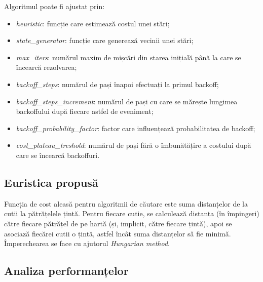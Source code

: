 \documentclass{article}
\begin{document}
Algoritmul poate fi ajustat prin:
\begin{itemize}
    \item \textit{heuristic}: funcție care estimează costul unei stări;
    \item \textit{state\_generator}: funcție care generează vecinii unei stări;
    \item \textit{max\_iters}: numărul maxim de mișcări din starea inițială până
    la care se încearcă rezolvarea;
    \item \textit{backoff\_steps}: numărul de pași înapoi efectuați la primul 
    backoff;
    \item \textit{backoff\_steps\_increment}: numărul de pași cu care se mărește
    lungimea backoffului după fiecare astfel de eveniment;
    \item \textit{backoff\_probability\_factor}: factor care influențează 
    probabilitatea de backoff;
    \item \textit{cost\_plateau\_treshold}: numărul de pași fără o îmbunătățire
    a costului după care se încearcă backoffuri.
\end{itemize}

\subsection{Euristica propusă}

Funcția de cost aleasă pentru algoritmii de căutare este suma distanțelor de la
cutii la pătrățelele țintă. Pentru fiecare cutie, se calculează distanța 
(în împingeri) către fiecare pătrățel de pe hartă (și, implicit, către fiecare 
țintă), apoi se asociază fiecărei cutii o țintă, astfel încât suma distanțelor 
să fie minimă. Împerechearea se face cu ajutorul \textit{Hungarian method}.

\subsection{Analiza performanțelor}\label{sec:performances}
\end{document}
